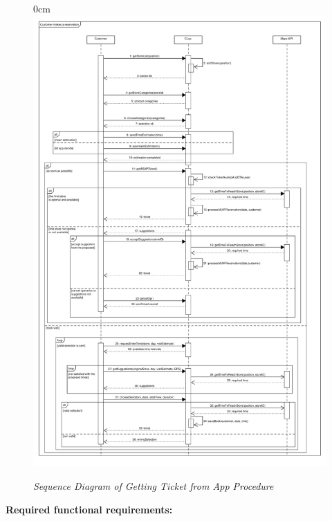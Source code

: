 \documentclass{article}
\begin{document}
\begin{center}
							\begin{figure}
								\begin{adjustwidth} {0cm}{}
									\centering
									\includegraphics[scale=0.33]{SD/5_makeReservation.pdf}\\
									\caption{\emph{Sequence Diagram of Getting Ticket from App Procedure}}
								\end{adjustwidth}
							\end{figure}

					\begin{itemize}
					\bigskip
					\bigskip
					\bigskip
					 {\bfseries Required functional requirements: }



\end{itemize}
\end{center}
\end{document}
